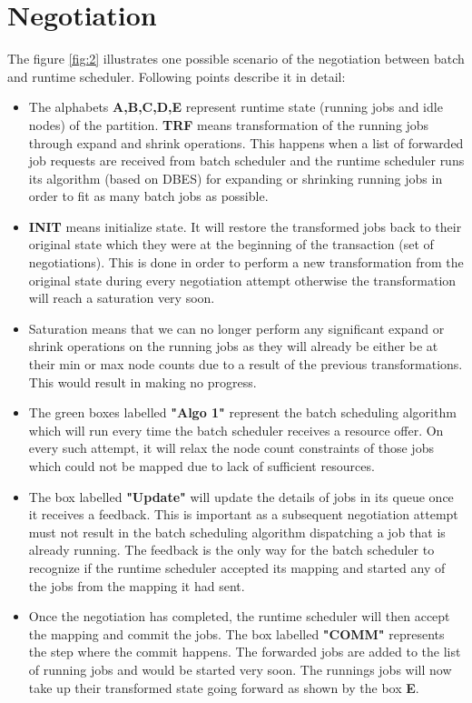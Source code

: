 \section{Negotiation}
The figure \ref{fig:2} illustrates one possible scenario of the negotiation between batch and runtime scheduler. Following points describe it in detail:
\begin{itemize}
\item The alphabets \textbf{A,B,C,D,E} represent runtime state (running jobs and idle nodes) of the partition. \textbf{TRF} means transformation of the running jobs through expand and shrink operations. This happens when a list of forwarded job requests are received from batch scheduler and the runtime scheduler runs its algorithm (based on DBES) for expanding or shrinking running jobs in order to fit as many batch jobs as possible.
\item \textbf{INIT} means initialize state. It will restore the transformed jobs back to their original state which they were at the beginning of the transaction (set of negotiations). This is done in order to perform a new transformation from the original state during every negotiation attempt otherwise the transformation will reach a saturation very soon.
\item Saturation means that we can no longer perform any significant expand or shrink operations on the running jobs as they will already be either be at their min or max node counts due to a result of the previous transformations. This would result in making no progress.
\item The green boxes labelled \textbf{"Algo 1"} represent the batch scheduling algorithm which will run every time the batch scheduler receives a resource offer. On every such attempt, it will relax the node count constraints of those jobs which could not be mapped due to lack of sufficient resources.
\item The box labelled \textbf{"Update"} will update the details of jobs in its queue once it receives a feedback. This is important as a subsequent negotiation attempt must not result in the batch scheduling algorithm dispatching a job that is already running. The feedback is the only way for the batch scheduler to recognize if the runtime scheduler accepted its mapping and started any of the jobs from the mapping it had sent.  
\item Once the negotiation has completed, the runtime scheduler will then accept the mapping and commit the jobs. The box labelled \textbf{"COMM"} represents the step where the commit happens. The forwarded jobs are added to the list of running jobs and would be started very soon. The runnings jobs will now take up their transformed state going forward as shown by the box \textbf{E}.
\end{itemize}
